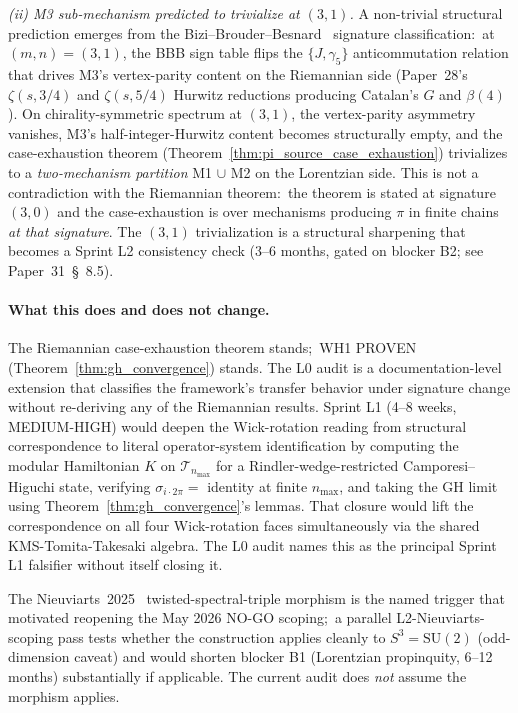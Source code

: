 \documentclass[11pt]{article}
\begin{document}
\medskip
\noindent\emph{(ii) M3 sub-mechanism predicted to trivialize at
$(3, 1)$.}  A non-trivial structural prediction emerges from the
Bizi--Brouder--Besnard~\cite{bizi_brouder_besnard2018} signature
classification:\ at $(m, n) = (3, 1)$, the BBB sign table flips the
$\{J, \gamma_5\}$ anticommutation relation that drives M3's
vertex-parity content on the Riemannian side (Paper~28's
$\zeta(s, 3/4)$ and $\zeta(s, 5/4)$ Hurwitz reductions producing
Catalan's $G$ and $\beta(4)$).  On chirality-symmetric spectrum at
$(3, 1)$, the vertex-parity asymmetry vanishes, M3's
half-integer-Hurwitz content becomes structurally empty, and the
case-exhaustion theorem
(Theorem~\ref{thm:pi_source_case_exhaustion}) trivializes to a
\emph{two-mechanism partition} M1 $\cup$ M2 on the Lorentzian side.
This is not a contradiction with the Riemannian theorem:\ the theorem
is stated at signature $(3, 0)$ and the case-exhaustion is over
mechanisms producing $\pi$ in finite chains \emph{at that signature}.
The $(3, 1)$ trivialization is a structural sharpening that becomes
a Sprint L2 consistency check (3--6 months, gated on blocker B2; see
Paper~31~\S~8.5).

\paragraph{What this does and does not change.}
The Riemannian case-exhaustion theorem stands;\ WH1 PROVEN
(Theorem~\ref{thm:gh_convergence}) stands.  The L0 audit is a
documentation-level extension that classifies the framework's transfer
behavior under signature change without re-deriving any of the
Riemannian results.  Sprint L1 (4--8 weeks, MEDIUM-HIGH) would
deepen the Wick-rotation reading from structural correspondence to
literal operator-system identification by computing the modular
Hamiltonian $K$ on $\mathcal{T}_{n_{\max}}$ for a Rindler-wedge-restricted
Camporesi--Higuchi state, verifying $\sigma_{i \cdot 2\pi} = $ identity
at finite $n_{\max}$, and taking the GH limit using
Theorem~\ref{thm:gh_convergence}'s lemmas.  That closure would lift the
correspondence on all four Wick-rotation faces simultaneously via the
shared KMS-Tomita-Takesaki algebra.  The L0 audit names this as the
principal Sprint L1 falsifier without itself closing it.

The Nieuviarts~2025~\cite{nieuviarts2025a} twisted-spectral-triple
morphism is the named trigger that motivated reopening the May 2026
NO-GO scoping;\ a parallel L2-Nieuviarts-scoping pass tests whether
the construction applies cleanly to $S^3 = \mathrm{SU}(2)$
(odd-dimension caveat) and would shorten blocker B1 (Lorentzian
propinquity, 6--12 months) substantially if applicable.  The current
audit does \emph{not} assume the morphism applies.
\end{document}
